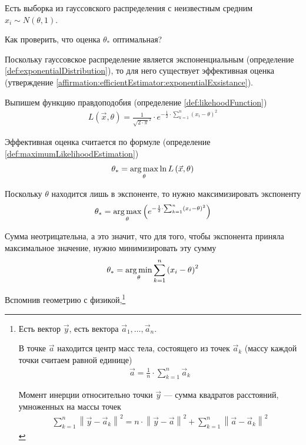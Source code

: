 \begin{example}\label{example:leastSquares:scalarOptimalEstimator}
  Есть выборка \xsample из гауссовского распределения с неизвестным
  средним $x_i \sim N\left( \theta, 1 \right)$.

  Как проверить, что оценка $\theta_*$ оптимальная?

  Поскольку гауссовское распределение является экспоненциальным
  (определение \ref{def:exponentialDistribution}),
  то для него существует эффективная оценка
  (утверждение \ref{affirmation:efficientEstimator:exponentialExsistance}).

  Выпишем функцию правдоподобия (определение \ref{def:likehoodFunction})
  \begin{align*}
      L\left( \vec{x}, \theta \right)
      = \frac{1}{\sqrt{2 \cdot \pi}^2}
      \cdot e^{- \frac{1}{2}
          \cdot \sum_{k=1}^{n}\left( x_i - \theta \right)^2}
  \end{align*}

  Эффективная оценка считается по формуле (определение
  \ref{def:maximumLikelihoodEstimation})
  \begin{align*}
      \theta_* = \underset{\theta}{\operatorname{arg\,max}}\ln{L\left( \vec{x},\theta \right)}
  \end{align*}

  Поскольку $\theta$ находится лишь в экспоненте, то нужно максимизировать
  экспоненту
  \begin{align*}
      \theta_* = \underset{\theta}{\operatorname{arg\,max}}\left( e^{- \frac{1}{2}
      \cdot \sum_{k=1}^{n}\left( x_i - \theta \right)^2} \right)
  \end{align*}

  Сумма неотрицательна, а это значит, что для того, чтобы экспонента приняла
  максимальное значение, нужно минимизировать эту сумму
  \begin{align*}
      \theta_* = \underset{\theta}{\operatorname{arg\,min}}
      \sum_{k=1}^{n}\left( x_i - \theta \right)^2
  \end{align*}

  Вспомнив геометрию с физикой,\footnote{
      Есть вектор $\vec{y}$, есть вектора $\vec{a}_1, \dots, \vec{a}_n$.

      В точке $\vec{a}$ находится центр масс тела, состоящего из точек
      $\vec{a}_k$ (массу каждой точки считаем равной единице)
      \begin{align*}
      \vec{a} = \frac{1}{n} \cdot \sum_{k=1}^{n} \vec{a}_k
      \end{align*}

      Момент инерции относительно точки $\vec{y}$ --- сумма квадратов
      расстояний, умноженных на массы точек
      \begin{align*}
      \sum_{k=1}^{n} \left\| \vec{y} - \vec{a}_k \right\|^2
      = n \cdot \left\| \vec{y} - \vec{a} \right\|^2
          + \sum_{k=1}^{n} \left\| \vec{a} - \vec{a}_k \right\|^2
      \end{align*}

}
\end{example}
